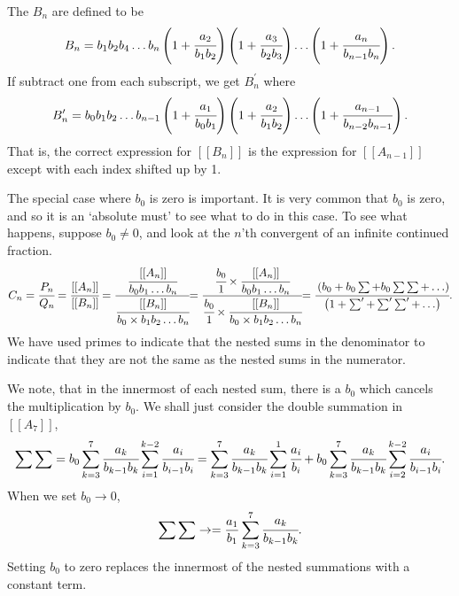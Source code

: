 \documentclass[16pt]{article}
\numberwithin{equation}{section}
\numberwithin{figure}{section}
\numberwithin{figure}{section}
\numberwithin{equation}{section}
\begin{document}
The $B_n$ are defined to be
\begin{equation}
B_n= b_1 b_2 b_4 \ldots b_n \left(1+\cfrac{a_2}{b_1 b_2} \right )
\left(1+\cfrac{a_3}{b_2 b_3} \right ) \ldots \left(1+\cfrac{a_n}{b_{n-1} b_n} \right ).                       
\end{equation}
If subtract one from each subscript, we get $B_n^\prime$ where 
\begin{equation}
B_n^\prime= b_0 b_1 b_2 \ldots b_{n-1} \left (1+\cfrac{a_1}{b_0 b_1} \right )
\left(1+\cfrac{a_2}{b_1 b_2} \right ) \ldots \left (1+\cfrac{a_{n-1}}{b_{n-2} b_{n-1}} \right ).                       
\end{equation}
That is, the correct expression for $[[B_n]]$ is the expression for $[[A_{n-1}]]$
 except with each index shifted up by 1.

The special case where $b_0$ is zero is important. It is very common that $b_0$ is zero, and
so it is an `absolute must' to see what to do in this case.
To see what happens, suppose $b_0 \ne 0$, and look at the $n$'th convergent of an infinite
 continued fraction.
\begin{equation}
C_n=\cfrac{P_n}{Q_n}=\cfrac{[[A_n]]}{[[B_n]]}
=\cfrac{ \cfrac{[[A_n]]}{b_0 b_1 \ldots b_n}  }{  \cfrac{[[B_n]]}{b_0 \times b_1 b_2  \ldots b_n}   }
$$    $$
=\cfrac{    \cfrac{b_0}{1} \times  \cfrac{[[A_n]]}{b_0 b_1 \ldots b_n}    }
       {    \cfrac{b_0}{1} \times  \cfrac{[[B_n]]}{b_0 \times b_1 b_2  \ldots b_n}  }
$$    $$
=\cfrac{  \left ( b_0 +b_0 \sum +b_0 \sum \sum+\ldots \right )   }
{ \left ( 1 +\sum^\prime +\sum^\prime \sum^\prime +\ldots \right )   }.
\end{equation}
We have used primes to indicate that the nested sums in the denominator to indicate
 that they are not the same as the nested sums in the numerator.

We note, that in the innermost of each nested sum, there is a $b_0$ which cancels the multiplication
by $b_0$. We shall just consider the double summation in $[[A_7]]$,
\begin{equation}
\sum\sum=b_0 \sum_{k=3}^{7} \cfrac{a_k}{b_{k-1} b_k}\sum_{i=1}^{k-2} \cfrac{a_i}{b_{i-1} b_i}
=\sum_{k=3}^{7} \cfrac{a_k}{b_{k-1} b_k}\sum_{i=1}^{1} \cfrac{a_i}{ b_i}
+ b_0 \sum_{k=3}^{7} \cfrac{a_k}{b_{k-1} b_k}\sum_{i=2}^{k-2} \cfrac{a_i}{b_{i-1} b_i}.
\end{equation}
When we set $b_0 \rightarrow 0$,
\begin{equation}
\sum\sum\rightarrow
=\frac{a_1}{b_1}\sum_{k=3}^{7} \cfrac{a_k}{b_{k-1} b_k}.
\end{equation} 
Setting $b_0$ to zero replaces the innermost of the nested summations with a constant term.
\end{document}
